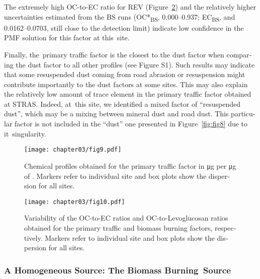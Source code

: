 \begin{otherlanguage}{english}
The extremely high OC-to-EC ratio for REV (Figure~\ref{fig:fig10}) and the relatively
higher uncertainties estimated from the BS runs (OC*\textsubscript{BS},
\SIrange{0.000}{0.937}{\concum}; EC\textsubscript{BS}, and
\SIrange{0.0162}{0.0703}{\concum}, still close to the detection limit) indicate  low
confidence in the PMF solution for this factor at this~site.

Finally, the~primary traffic factor is the closest to the dust factor when comparing the
dust factor to all other profiles (see   Figure S1). Such results may indicate that some
resuspended dust coming from road abrasion or resuspension might contribute importantly to
the dust factors at some sites.  This may also explain the relatively low amount of trace
element in the primary traffic factor obtained at STRAS. Indeed, at~this site, we
identified a mixed factor of ``resuspended dust'',  which  may be a mixing between mineral
dust and road dust. This particular factor is not included in the ``dust'' one presented
in Figure~\ref{fig:fig8} due to it~singularity.

\begin{figure}[h]
    \centering
    \texttt{[image: chapter03/fig9.pdf]}
    \caption{
        Chemical profiles obtained for the primary traffic factor in
        \si{\micro\gram} per \si{\micro\gram} of \PM{}. Markers refer to
        individual site and box plots show the dispersion for all sites.
    }
    \label{fig:fig9}
\end{figure}


\begin{figure}[h]
    \centering
    \texttt{[image: chapter03/fig10.pdf]}
    \caption{
        Variability of the OC-to-EC ratios and OC-to-Levoglucosan ratios obtained
        for the primary traffic and biomass burning factors, respectively.
        Markers refer to individual site and box plots show the dispersion for
        all sites.
    }
    \label{fig:fig10}
\end{figure}

\subsubsection{A Homogeneous Source: The Biomass Burning~Source}%
\label{ssub:a_homogeneous_source_the_biomass_burning_source}


\end{otherlanguage}
